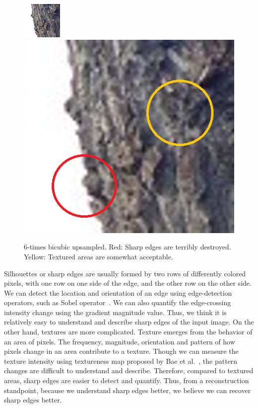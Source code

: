 \begin{figure}[htbp]\centering
\includegraphics{imagesPM/f2.png}\vspace{1.1mm}
\includegraphics{imagesPM/f1.png}
\caption{6-times bicubic upsampled. Red: Sharp edges are terribly destroyed. Yellow: Textured areas are somewhat acceptable.}
\label{fig:reexamineUpsampling}
\end{figure}

Silhouettes or sharp edges are usually formed by two rows of differently colored pixels, with one row on one side of the edge, and the other row on the other side. We can detect the location and orientation of an edge using edge-detection operators, such as Sobel operator~\cite[p.~271-273]{Sobel}. We can also quantify the edge-crossing intensity change using the gradient magnitude value. Thus, we think it is relatively easy to understand and describe sharp edges of the input image. On the other hand, textures are more complicated. Texture emerges from the behavior of an area of pixels. The frequency, magnitude, orientation and pattern of how pixels change in an area contribute to a texture. Though we can measure the texture intensity using textureness map proposed by Bae et al.~\cite{Bae:2006}, the pattern changes are difficult to understand and describe. Therefore, compared to textured areas, sharp edges are easier to detect and quantify. Thus, from a reconstruction standpoint, because we understand sharp edges better, we believe we can recover sharp edges better.

